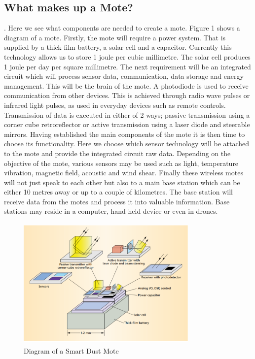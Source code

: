 \documentclass[article]{IEEEtran}
\begin{document}
\subsection*{What makes up a Mote?}.\newline
Here we see what components are needed to create a mote. 
Figure 1 shows a diagram of a mote. Firstly, the mote will require a power system. That is supplied by a thick film battery, a solar cell and a capacitor. Currently this technology allows us to store 1 joule per cubic millimetre. The solar cell produces 1 joule per day per square millimetre. 
The next requirement will be an integrated circuit which will process sensor data, communication, data storage and energy management. This will be the brain of the mote. 
A photodiode is used to receive communication from other devices. This is achieved through radio wave pulses or infrared light pulses, as used in everyday devices such as remote controls. 
Transmission of data is executed in either of 2 ways; passive transmission using a corner cube retroreflector or active transmission using a laser diode and steerable mirrors.
Having established the main components of the mote it is then time to choose its functionality. Here we choose which sensor technology will be attached to the mote and provide the integrated circuit raw data. Depending on the objective of the mote, various sensors may be used such as light, temperature vibration, magnetic field, acoustic and wind shear.
Finally these wireless motes will not just speak to each other but also to a main base station which can be either 10 metres away or up to a couple of kilometres.  The base station will receive data from the motes and process it into valuable information. Base stations may reside in a computer, hand held device or even in drones\cite{Mili}.

\begin{figure}[h!]
\graphicspath{ {images/} }
\includegraphics[width=8.8cm, height=6.5cm]{figure1}
\caption{Diagram of a Smart Dust Mote}
\label{Mote Diagram}
\end{figure}
\end{document}
